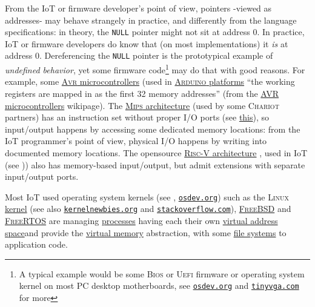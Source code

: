  From the IoT or firmware developer's point of view, pointers -viewed
 as addresses- may behave strangely in practice, and differently from
 the language specifications: in theory, the \texttt{NULL} pointer
 might not sit at address 0. In practice, IoT or firmware developers
 do know that (on most implementations) it \emph{is} at address
 0. Dereferencing the \texttt{NULL} pointer is the prototypical
 example of \emph{undefined behavior}, yet some firmware
 code\footnote{A typical example would be some \textsc{Bios} or
   \textsc{Uefi} firmware or operating system kernel on most PC
   desktop motherboards, see
   \href{https://osdev.org/}{\texttt{osdev.org}} and
   \href{http://tinyvga.com/}{\texttt{tinyvga.com}} for more} may do
 that with good reasons. For example, some
 \href{https://en.wikipedia.org/wiki/AVR_microcontrollers}{\textsc{Avr}
   microcontrollers}  (used in
 \href{https://arduino.cc/}{\textsc{Arduino} platforms} ``the working
 registers are mapped in as the first 32 memory addresses'' (from the
 \href{https://en.wikipedia.org/wiki/AVR_microcontrollers}{AVR
   microcontrollers} wikipage). The
 \href{https://en.wikipedia.org/wiki/MIPS_architecture}{\textsc{Mips}
   architecture} (used by some \textsc{Chariot} partners) has an
  instruction set without
 proper I/O ports (see
 \href{https://www2.cs.duke.edu/courses/fall13/compsci250/MIPS32\_QRC.pdf}{this}),
 so input/output happens by accessing some dedicated memory locations:
 from the IoT programmer's point of view, physical I/O happens by
 writing into documented memory locations. The opensource
 \href{https://riscv.org/}{\textsc{Risc-V} architecture}
 , used in IoT (see
 \cite{lee:2020:miot, waterman:2016:riscv-design})) also has
 memory-based input/output, but admit extensions with separate
 input/output ports.

 Most IoT used operating system kernels (see
 \cite{ArpaciDusseau14-Book},   
 \href{https://osdev.org}{\texttt{osdev.org}}) such as the
 \textsc{Linux} \href{http://kernel.org/}{kernel} (see also
 \href{https://kernelnewbies.org}{\texttt{kernelnewbies.org}} and
 \href{https://stackoverflow.com/}{\texttt{stackoverflow.com}}),
 \href{https://www.freebsd.org/}{\textsc{FreeBSD}} and
 \href{https://freertos.org/}{\textsc{FreeRTOS}} are managing
 \href{https://en.wikipedia.org/wiki/Process_(computing)}{processes}
 having each their own
 \href{https://en.wikipedia.org/wiki/Virtual_address_space}{virtual
   address space}and provide the
 \href{https://en.wikipedia.org/wiki/Virtual_memory}{virtual memory}
 abstraction, with some
 \href{https://en.wikipedia.org/wiki/File_system}{file systems} to
 application code.
 
